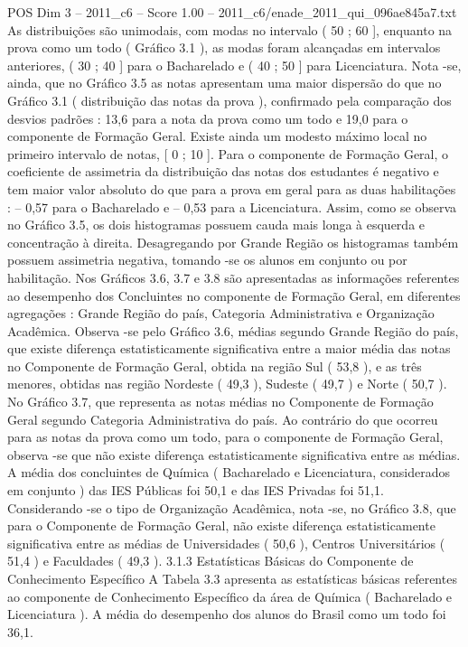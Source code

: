 \begin{textsample}{POS Dim 3 – 2011\_c6 – Score 1.00 – 2011\_c6/enade\_2011\_qui\_096ae845a7.txt}
As distribuições são unimodais, com modas no intervalo ( 50 ; 60 ], enquanto na prova como um todo ( Gráfico 3.1 ), as modas foram alcançadas em intervalos anteriores, ( 30 ; 40 ] para o Bacharelado e ( 40 ; 50 ] para Licenciatura.
Nota -se, ainda, que no Gráfico 3.5 as notas apresentam uma maior dispersão do que no Gráfico 3.1 ( distribuição das notas da prova ), confirmado pela comparação dos desvios padrões : 13,6 para a nota da prova como um todo e 19,0 para o componente de Formação Geral.
Existe ainda um modesto máximo local no primeiro intervalo de notas, [ 0 ; 10 ].
Para o componente de Formação Geral, o coeficiente de assimetria da distribuição das notas dos estudantes é negativo e tem maior valor absoluto do que para a prova em geral para as duas habilitações : – 0,57 para o Bacharelado e – 0,53 para a Licenciatura.
Assim, como se observa no Gráfico 3.5, os dois histogramas possuem cauda mais longa à esquerda e concentração à direita.
Desagregando por Grande Região os histogramas também possuem assimetria negativa, tomando -se os alunos em conjunto ou por habilitação.
Nos Gráficos 3.6, 3.7 e 3.8 são apresentadas as informações referentes ao desempenho dos Concluintes no componente de Formação Geral, em diferentes agregações : Grande Região do país, Categoria Administrativa e Organização Acadêmica.
Observa -se pelo Gráfico 3.6, médias segundo Grande Região do país, que existe diferença estatisticamente significativa entre a maior média das notas no Componente de Formação Geral, obtida na região Sul ( 53,8 ), e as três menores, obtidas nas região Nordeste ( 49,3 ), Sudeste ( 49,7 ) e Norte ( 50,7 ).
No Gráfico 3.7, que representa as notas médias no Componente de Formação Geral segundo Categoria Administrativa do país.
Ao contrário do que ocorreu para as notas da prova como um todo, para o componente de Formação Geral, observa -se que não existe diferença estatisticamente significativa entre as médias.
A média dos concluintes de Química ( Bacharelado e Licenciatura, considerados em conjunto ) das IES Públicas foi 50,1 e das IES Privadas foi 51,1.
Considerando -se o tipo de Organização Acadêmica, nota -se, no Gráfico 3.8, que para o Componente de Formação Geral, não existe diferença estatisticamente significativa entre as médias de Universidades ( 50,6 ), Centros Universitários ( 51,4 ) e Faculdades ( 49,3 ). 3.1.3 Estatísticas Básicas do Componente de Conhecimento Específico A Tabela 3.3 apresenta as estatísticas básicas referentes ao componente de Conhecimento Específico da área de Química ( Bacharelado e Licenciatura ).
A média do desempenho dos alunos do Brasil como um todo foi 36,1.

\end{textsample}
